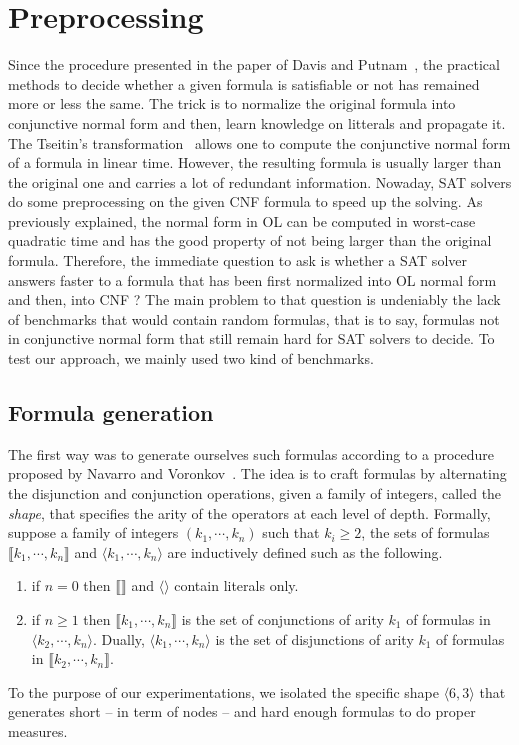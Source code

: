 \documentclass[a4paper, 11pt]{article}
\begin{document}
    \section{Preprocessing}
    Since the procedure presented in the paper of Davis and Putnam~\cite{10.1145/321033.321034}, the
    practical methods to decide whether a given formula is satisfiable or not has remained more or less
    the same. The trick is to normalize the original formula into conjunctive normal form and then,
    learn knowledge on litterals and propagate it. The Tseitin's transformation~\cite{Tseitin1983} 
    allows one to compute
    the conjunctive normal form of a formula in linear time. However, the resulting formula is usually
    larger than the original one and carries a lot of redundant information. Nowaday, SAT solvers do
    some preprocessing on the given CNF formula to speed up the solving. As previously explained, the
    normal form in OL can be computed in worst-case quadratic time and has the good property of not
    being larger than the original formula. Therefore, the immediate question to ask is whether a SAT
    solver answers faster to a formula that has been first normalized into OL normal form and then, into 
    CNF ? The main problem to that question is undeniably the lack of benchmarks that would contain
    random formulas, that is to say, formulas not in conjunctive normal form that still remain hard for
    SAT solvers to decide. To test our approach, we mainly used two kind of benchmarks.
    \subsection{Formula generation}
    The first way was to generate ourselves such formulas according to a procedure
    proposed by Navarro and Voronkov~\cite{11cf478fe9d5463eb66cfafaa9577771}. The idea is to craft
    formulas by alternating the disjunction and conjunction operations, given a family of integers,
    called the \textit{shape}, that specifies the arity of the operators at each level of depth. 
    Formally,
    suppose a family of integers $(k_1,\cdots,k_n)$ such that $k_i\ge 2$, the sets of formulas
    $\llbracket k_1,\cdots,k_n\rrbracket$ and $\langle k_1,\cdots,k_n\rangle$ are inductively defined
    such as the following.
    \begin{enumerate}
	    \item
		if $n=0$ then $\llbracket\rrbracket$ and $\langle\rangle$ contain literals only.
	\item
		if $n\ge 1$ then $\llbracket k_1,\cdots,k_n\rrbracket$ is the set of conjunctions
		    of arity $k_1$ of formulas in $\langle k_2,\cdots,k_n\rangle$. Dually,
		    $\langle k_1,\cdots,k_n\rangle$ is the set of disjunctions of arity $k_1$ of
		    formulas in $\llbracket k_2,\cdots,k_n\rrbracket$.
    \end{enumerate}
    To the purpose of our experimentations, we isolated the specific shape $\langle 6,3\rangle$ that
    generates short -- in term of nodes -- and hard enough formulas to do proper measures.
\end{document}
